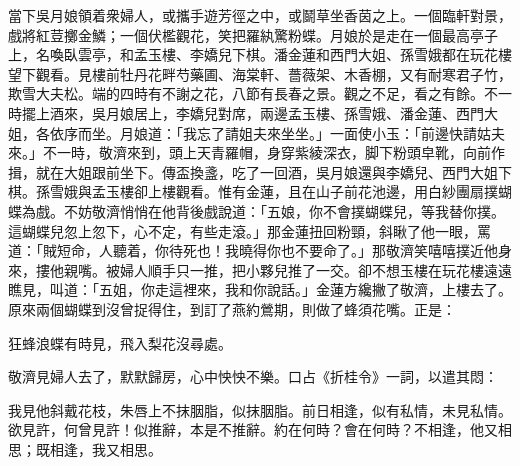 當下吳月娘領着衆婦人，或攜手遊芳徑之中，或鬬草坐香茵之上。一個臨軒對景，戲將紅荳擲金鱗；一個伏檻觀花，笑把羅紈驚粉蝶。{}月娘於是走在一個最高亭子上，名喚臥雲亭，和孟玉樓、李嬌兒下棋。潘金蓮和西門大姐、孫雪娥都在玩花樓望下觀看。見樓前牡丹花畔芍藥圃、海棠軒、薔薇架、木香棚，又有耐寒君子竹，欺雪大夫松。端的四時有不謝之花，八節有長春之景。觀之不足，看之有餘。不一時擺上酒來，吳月娘居上，李嬌兒對席，兩邊孟玉樓、孫雪娥、潘金蓮、西門大姐，各依序而坐。月娘道：「我忘了請姐夫來坐坐。」{}一面使小玉：「前邊快請姑夫來。」不一時，敬濟來到，頭上天青羅帽，身穿紫綾深衣，脚下粉頭皁靴，向前作揖，就在大姐跟前坐下。傳盃換盞，吃了一回酒，吳月娘還與李嬌兒、西門大姐下棋。孫雪娥與孟玉樓卻上樓觀看。惟有金蓮，且在山子前花池邊，用白紗團扇撲蝴蝶為戲。不妨敬濟悄悄在他背後戲說道：「五娘，你不會撲蝴蝶兒，等我替你撲。這蝴蝶兒忽上忽下，心不定，有些走滾。」{}那金蓮扭回粉頸，斜瞅了他一眼，罵道：「賊短命，人聽着，你待死也！我曉得你也不要命了。」{}那敬濟笑嘻嘻撲近他身來，摟他親嘴。被婦人順手只一推，把小夥兒推了一交。卻不想玉樓在玩花樓遠遠瞧見，叫道：「五姐，你走這裡來，我和你說話。」金蓮方纔撇了敬濟，上樓去了。原來兩個蝴蝶到沒曾捉得住，到訂了燕約鶯期，則做了蜂須花嘴。正是：

\begin{myquote}
狂蜂浪蝶有時見，飛入梨花沒尋處。
\end{myquote}

敬濟見婦人去了，默默歸房，心中怏怏不樂。口占《折桂令》一詞，以遣其悶：

\begin{myquote}
我見他斜戴花枝，朱唇上不抹胭脂，似抹胭脂。前日相逢，似有私情，未見私情。欲見許，何曾見許！似推辭，本是不推辭。約在何時？會在何時？不相逢，他又相思；既相逢，我又相思。
\end{myquote}

